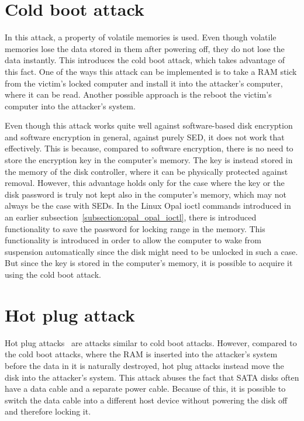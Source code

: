 

\section{Cold boot attack}
\label{cold_boot_attack}

In this attack, a property of volatile memories is used. Even though volatile memories lose the data stored in them after powering off, they do not lose the data instantly. This introduces the cold boot attack, which takes advantage of this fact. One of the ways this attack can be implemented is to take a RAM stick from the victim's locked computer and install it into the attacker's computer, where it can be read. Another possible approach is the reboot the victim's computer into the attacker's system.

Even though this attack works quite well against software-based disk encryption and software encryption in general, against purely SED, it does not work that effectively. This is because, compared to software encryption, there is no need to store the encryption key in the computer's memory. The key is instead stored in the memory of the disk controller, where it can be physically protected against removal.
However, this advantage holds only for the case where the key or the disk password is truly not kept also in the computer's memory, which may not always be the case with SEDs. In the Linux Opal ioctl commands introduced in an earlier subsection~\ref{subsection:opal_opal_ioctl}, there is introduced functionality to save the password for locking range in the memory. This functionality is introduced in order to allow the computer to wake from suspension automatically since the disk might need to be unlocked in such a case. But since the key is stored in the computer's memory, it is possible to acquire it using the cold boot attack.

\section{Hot plug attack}

Hot plug attacks~\cite{self_decrypting_risks} are attacks similar to cold boot attacks. However, compared to the cold boot attacks, where the RAM is inserted into the attacker's system before the data in it is naturally destroyed, hot plug attacks instead move the disk into the attacker's system. This attack abuses the fact that SATA disks often have a data cable and a separate power cable. Because of this, it is possible to switch the data cable into a different host device without powering the disk off and therefore locking it. 

